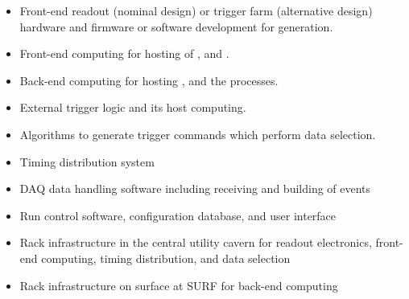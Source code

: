 \begin{itemize}
\item Front-end readout (nominal design) or trigger farm (alternative
  design) hardware and firmware or software development for
   generation.
\item Front-end computing for hosting of ,  and .
\item Back-end computing for hosting ,  and the  processes.
\item External trigger logic and its host computing.
\item Algorithms to generate trigger commands which perform data selection.
\item Timing distribution system
\item DAQ data handling software including receiving and building of
  events
\item Run control software, configuration database, and user interface
\item Rack infrastructure in the central utility cavern for readout
  electronics, front-end computing, timing distribution, and data
  selection
\item Rack infrastructure on surface at SURF for back-end computing
\end{itemize}

